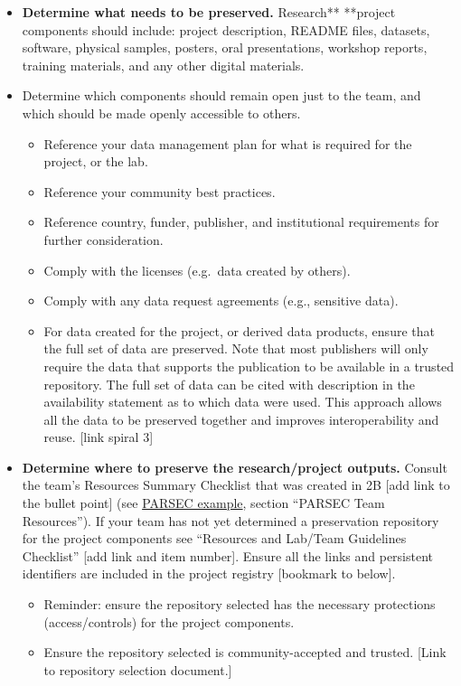 \documentclass[
  letterpaper,
  DIV=11,
  numbers=noendperiod]{scrreport}
\providecommand{\tightlist}{%
  \setlength{\itemsep}{0pt}\setlength{\parskip}{0pt}}\usepackage{longtable,booktabs,array}
\begin{document}
\begin{itemize}
\tightlist
\item
  \textbf{Determine what needs to be preserved. }Research** **project
  components should include: project description, README files,
  datasets, software, physical samples, posters, oral presentations,
  workshop reports, training materials, and any other digital materials.
\item
  Determine which components should remain open just to the team, and
  which should be made openly accessible to others.

  \begin{itemize}
  \tightlist
  \item
    Reference your data management plan for what is required for the
    project, or the lab.
  \item
    Reference your community best practices.
  \item
    Reference country, funder, publisher, and institutional requirements
    for further consideration.
  \item
    Comply with the licenses (e.g.~data created by others).
  \item
    Comply with any data request agreements (e.g., sensitive data).
  \item
    For data created for the project, or derived data products, ensure
    that the full set of data are preserved. Note that most publishers
    will only require the data that supports the publication to be
    available in a trusted repository. The full set of data can be cited
    with description in the availability statement as to which data were
    used. This approach allows all the data to be preserved together and
    improves interoperability and reuse. {[}link spiral 3{]}
  \end{itemize}
\item
  \textbf{Determine where to preserve the research/project outputs.}
  Consult the team's Resources Summary Checklist that was created in 2B
  {[}add link to the bullet point{]} (see
  \href{https://doi.org/10.5281/zenodo.4909852}{PARSEC example}, section
  ``PARSEC Team Resources''). If your team has not yet determined a
  preservation repository for the project components see ``Resources and
  Lab/Team Guidelines Checklist'' {[}add link and item number{]}. Ensure
  all the links and persistent identifiers are included in the project
  registry {[}bookmark to below{]}.

  \begin{itemize}
  \tightlist
  \item
    Reminder: ensure the repository selected has the necessary
    protections (access/controls) for the project components.
  \item
    Ensure the repository selected is community-accepted and trusted.
    {[}Link to repository selection document.{]}
  \end{itemize}
\end{itemize}
\end{document}
